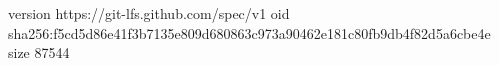 version https://git-lfs.github.com/spec/v1
oid sha256:f5cd5d86e41f3b7135e809d680863c973a90462e181c80fb9db4f82d5a6cbe4e
size 87544
